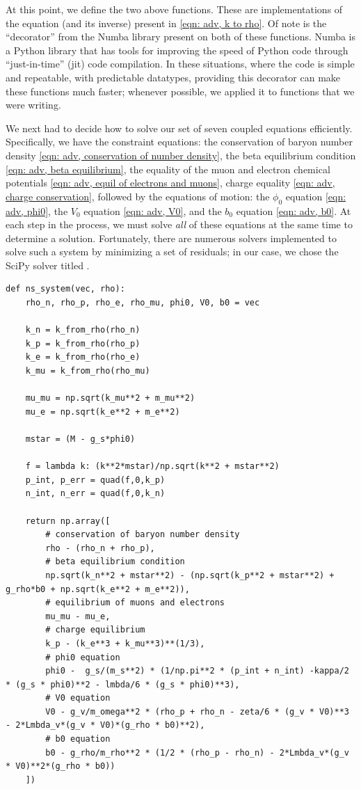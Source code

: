 At this point, we define the two above functions. These are implementations of the equation (and its inverse) present in \eqref{eqn: adv, k to rho}. Of note is the  ``decorator'' from the Numba library present on both of these functions. Numba is a Python library that has tools for improving the speed of Python code through ``just-in-time'' (jit) code compilation. In these situations, where the code is simple and repeatable, with predictable datatypes, providing this decorator can make these functions much faster; whenever possible, we applied it to functions that we were writing. 

We next had to decide how to solve our set of seven coupled equations efficiently. Specifically, we have the constraint equations: the conservation of baryon number density \eqref{eqn: adv, conservation of number density}, the beta equilibrium condition \eqref{eqn: adv, beta equilibrium}, the equality of the muon and electron chemical potentials \eqref{eqn: adv, equil of electrons and muons}, charge equality \eqref{eqn: adv, charge conservation}, followed by the equations of motion: the $\phi_0$ equation \eqref{eqn: adv, phi0}, the $V_0$ equation \eqref{eqn: adv, V0}, and the $b_0$ equation \eqref{eqn: adv, b0}. At each step in the process, we must solve \textit{all} of these equations at the same time to determine a solution. Fortunately, there are numerous solvers implemented to solve such a system by minimizing a set of residuals; in our case, we chose the SciPy solver titled .

\begin{lstlisting}
def ns_system(vec, rho):
    rho_n, rho_p, rho_e, rho_mu, phi0, V0, b0 = vec

    k_n = k_from_rho(rho_n)
    k_p = k_from_rho(rho_p)
    k_e = k_from_rho(rho_e)
    k_mu = k_from_rho(rho_mu)

    mu_mu = np.sqrt(k_mu**2 + m_mu**2)
    mu_e = np.sqrt(k_e**2 + m_e**2)
    
    mstar = (M - g_s*phi0)

    f = lambda k: (k**2*mstar)/np.sqrt(k**2 + mstar**2)
    p_int, p_err = quad(f,0,k_p)
    n_int, n_err = quad(f,0,k_n)

    return np.array([
        # conservation of baryon number density
        rho - (rho_n + rho_p), 
        # beta equilibrium condition
        np.sqrt(k_n**2 + mstar**2) - (np.sqrt(k_p**2 + mstar**2) + g_rho*b0 + np.sqrt(k_e**2 + m_e**2)),
        # equilibrium of muons and electrons
        mu_mu - mu_e, 
        # charge equilibrium
        k_p - (k_e**3 + k_mu**3)**(1/3), 
        # phi0 equation
        phi0 -  g_s/(m_s**2) * (1/np.pi**2 * (p_int + n_int) -kappa/2 * (g_s * phi0)**2 - lmbda/6 * (g_s * phi0)**3), 
        # V0 equation
        V0 - g_v/m_omega**2 * (rho_p + rho_n - zeta/6 * (g_v * V0)**3 - 2*Lmbda_v*(g_v * V0)*(g_rho * b0)**2),
        # b0 equation
        b0 - g_rho/m_rho**2 * (1/2 * (rho_p - rho_n) - 2*Lmbda_v*(g_v * V0)**2*(g_rho * b0))
    ])
\end{lstlisting}

